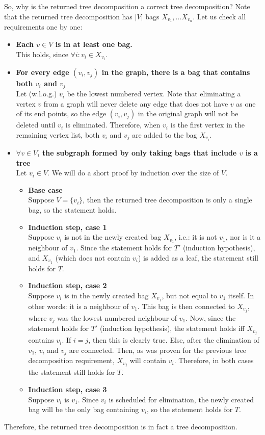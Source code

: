 So, why is the returned tree decomposition a correct tree decomposition? Note that the returned tree decomposition has $|V|$ bags $X_{v_1},...X_{v_n}$. Let us check all requirements one by one:
\begin{itemize}
\item \textbf{Each $v \in V$ is in at least one bag.}\\
	This holds, since $\forall i: v_i \in X_{v_i}$.
\item \textbf{For every edge $(v_i, v_j)$ in the graph, there is a bag that contains both $v_i$ and $v_j$}\\
	Let (w.l.o.g.) $v_i$ be the lowest numbered vertex. Note that eliminating a vertex $v$ from a graph will never delete any edge that does not have $v$ as one of its end points, so the edge $(v_i,v_j)$ in the original graph will not be deleted until $v_i$ is eliminated. Therefore, when $v_i$ is the first vertex in the remaining vertex list, both $v_i$ and $v_j$ are added to the bag $X_{v_i}$. 
\item \textbf{$\forall v \in V$, the subgraph formed by only taking bags that include $v$ is a tree}\\
	Let $v_i \in V$. We will do a short proof by induction over the size of $V$.
	\begin{itemize}
		\item \textbf{Base case}\\
		Suppose $V = \{v_i\}$, then the returned tree decomposition is only a single bag, so the statement holds.
		\item \textbf{Induction step, case 1}\\
		Suppose $v_i$ is not in the newly created bag $X_{v_1}$, i.e.: it is not $v_1$, nor is it a neighbour of $v_1$. Since the statement holds for $T'$ (induction hypothesis), and $X_{v_1}$ (which does not contain $v_i$) is added as a leaf, the statement still holds for $T$.
		\item \textbf{Induction step, case 2}\\
		Suppose $v_i$ is in the newly created bag $X_{v_1}$, but not equal to $v_1$ itself. In other words: it is a neighbour of $v_1$. This bag is then connected to $X_{v_j}$, where $v_j$ was the lowest numbered neighbour of $v_1$. Now, since the statement holds for $T'$ (induction hypothesis), the statement holds iff $X_{v_j}$ contains $v_i$. If $i = j$, then this is clearly true. Else, after the elimination of $v_1$, $v_i$ and $v_j$ are connected. Then, as was proven for the previous tree decomposition requirement, $X_{v_j}$ will contain $v_i$. Therefore, in both cases the statement still holds for $T$.
		\item \textbf{Induction step, case 3}\\
		Suppose $v_i$ is $v_1$. Since $v_i$ is scheduled for elimination, the newly created bag will be the only bag containing $v_i$, so the statement holds for $T$.
	\end{itemize}
	
\end{itemize}
Therefore, the returned tree decomposition is in fact a tree decomposition.


